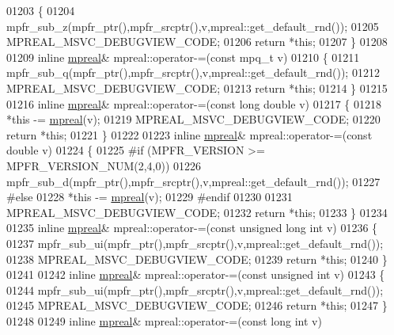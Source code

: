 \begin{DoxyCode}
01203 \{
01204     mpfr\_sub\_z(mpfr\_ptr(),mpfr\_srcptr(),v,mpreal::get\_default\_rnd());
01205     MPREAL\_MSVC\_DEBUGVIEW\_CODE;
01206     \textcolor{keywordflow}{return} *\textcolor{keyword}{this};
01207 \}
01208 
01209 \textcolor{keyword}{inline} \hyperlink{classmpfr_1_1mpreal}{mpreal}& mpreal::operator-=(\textcolor{keyword}{const} mpq\_t v)
01210 \{
01211     mpfr\_sub\_q(mpfr\_ptr(),mpfr\_srcptr(),v,mpreal::get\_default\_rnd());
01212     MPREAL\_MSVC\_DEBUGVIEW\_CODE;
01213     \textcolor{keywordflow}{return} *\textcolor{keyword}{this};
01214 \}
01215 
01216 \textcolor{keyword}{inline} \hyperlink{classmpfr_1_1mpreal}{mpreal}& mpreal::operator-=(\textcolor{keyword}{const} \textcolor{keywordtype}{long} \textcolor{keywordtype}{double} v)
01217 \{
01218     *\textcolor{keyword}{this} -= \hyperlink{classmpfr_1_1mpreal}{mpreal}(v);
01219     MPREAL\_MSVC\_DEBUGVIEW\_CODE;
01220     \textcolor{keywordflow}{return} *\textcolor{keyword}{this};
01221 \}
01222 
01223 \textcolor{keyword}{inline} \hyperlink{classmpfr_1_1mpreal}{mpreal}& mpreal::operator-=(\textcolor{keyword}{const} \textcolor{keywordtype}{double} v)
01224 \{
01225 \textcolor{preprocessor}{#if (MPFR\_VERSION >= MPFR\_VERSION\_NUM(2,4,0))}
01226     mpfr\_sub\_d(mpfr\_ptr(),mpfr\_srcptr(),v,mpreal::get\_default\_rnd());
01227 \textcolor{preprocessor}{#else}
01228     *\textcolor{keyword}{this} -= \hyperlink{classmpfr_1_1mpreal}{mpreal}(v);
01229 \textcolor{preprocessor}{#endif}
01230 
01231     MPREAL\_MSVC\_DEBUGVIEW\_CODE;
01232     \textcolor{keywordflow}{return} *\textcolor{keyword}{this};
01233 \}
01234 
01235 \textcolor{keyword}{inline} \hyperlink{classmpfr_1_1mpreal}{mpreal}& mpreal::operator-=(\textcolor{keyword}{const} \textcolor{keywordtype}{unsigned} \textcolor{keywordtype}{long} \textcolor{keywordtype}{int} v)
01236 \{
01237     mpfr\_sub\_ui(mpfr\_ptr(),mpfr\_srcptr(),v,mpreal::get\_default\_rnd());
01238     MPREAL\_MSVC\_DEBUGVIEW\_CODE;
01239     \textcolor{keywordflow}{return} *\textcolor{keyword}{this};
01240 \}
01241 
01242 \textcolor{keyword}{inline} \hyperlink{classmpfr_1_1mpreal}{mpreal}& mpreal::operator-=(\textcolor{keyword}{const} \textcolor{keywordtype}{unsigned} \textcolor{keywordtype}{int} v)
01243 \{
01244     mpfr\_sub\_ui(mpfr\_ptr(),mpfr\_srcptr(),v,mpreal::get\_default\_rnd());
01245     MPREAL\_MSVC\_DEBUGVIEW\_CODE;
01246     \textcolor{keywordflow}{return} *\textcolor{keyword}{this};
01247 \}
01248 
01249 \textcolor{keyword}{inline} \hyperlink{classmpfr_1_1mpreal}{mpreal}& mpreal::operator-=(\textcolor{keyword}{const} \textcolor{keywordtype}{long} \textcolor{keywordtype}{int} v)

\end{DoxyCode}
